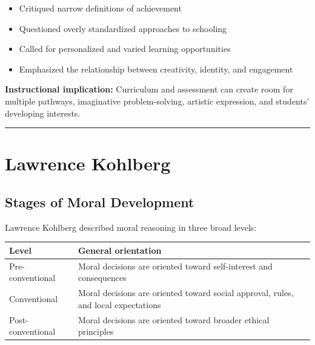 \documentclass[
  letterpaper,
  DIV=11,
  numbers=noendperiod]{scrartcl}
\providecommand{\tightlist}{%
  \setlength{\itemsep}{0pt}\setlength{\parskip}{0pt}}\usepackage{longtable,booktabs,array}
\begin{document}
\begin{itemize}
\tightlist
\item
  Critiqued narrow definitions of achievement
\item
  Questioned overly standardized approaches to schooling
\item
  Called for personalized and varied learning opportunities
\item
  Emphasized the relationship between creativity, identity, and
  engagement
\end{itemize}

\textbf{Instructional implication:} Curriculum and assessment can create
room for multiple pathways, imaginative problem-solving, artistic
expression, and students' developing interests.

\begin{center}\rule{0.5\linewidth}{0.5pt}\end{center}

\section{Lawrence Kohlberg}\label{lawrence-kohlberg}

\subsection{Stages of Moral
Development}\label{stages-of-moral-development}

Lawrence Kohlberg described moral reasoning in three broad levels:

\begin{longtable}[]{@{}
  >{\raggedright\arraybackslash}p{}
  >{\raggedright\arraybackslash}p{}@{}}
\toprule\noalign{}
\begin{minipage}[b]{\linewidth}\raggedright
Level
\end{minipage} & \begin{minipage}[b]{\linewidth}\raggedright
General orientation
\end{minipage} \\
\midrule\noalign{}
\endhead
\bottomrule\noalign{}
\endlastfoot
Pre-conventional & Moral decisions are oriented toward self-interest and
consequences \\
Conventional & Moral decisions are oriented toward social approval,
rules, and local expectations \\
Post-conventional & Moral decisions are oriented toward broader ethical
principles \\
\end{longtable}
\end{document}
